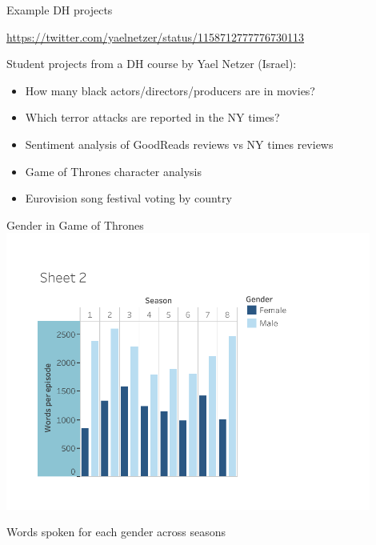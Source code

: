 \documentclass[aspectratio=169,usenames,dvipsnames]{beamer}
\begin{document}
\begin{frame}{Example DH projects}
\begin{reference}
\url{https://twitter.com/yaelnetzer/status/1158712777776730113}
\end{reference}
    Student projects from a DH course by Yael Netzer (Israel):
    \begin{itemize}
        \item How many black actors/directors/producers are in movies?
        \item Which terror attacks are reported in the NY times?
        \item Sentiment analysis of GoodReads reviews vs NY times reviews
        \item Game of Thrones character analysis
        \item Eurovision song festival voting by country
    \end{itemize}
\end{frame}

\begin{frame}{Gender in Game of Thrones}\centering
    \includegraphics[width=0.9\textwidth]{fig/got}

	Words spoken for each gender across seasons
\end{frame}
\end{document}

